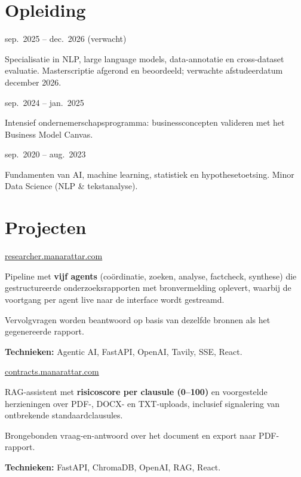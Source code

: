 \documentclass[10pt]{article}
\newcommand{\entry}[2]{\vspace{2pt}{\bfseries #1}\hfill{\small\color{gray}#2}\par}
\newcommand{\project}[2]{\vspace{3pt}{\bfseries #1}\hfill{\footnotesize\color{gray}#2}\par\vspace{-1pt}}
\newcommand{\pskills}[1]{{\small\textbf{Technieken:} #1}\par}
\begin{document}
\section*{Opleiding}
\entry{MA Language \& AI \,\textbar\, Vrije Universiteit Amsterdam}{sep.\ 2025 -- dec.\ 2026 (verwacht)}
\begin{tights}
  \item Specialisatie in NLP, large language models, data-annotatie en cross-dataset evaluatie. Masterscriptie afgerond en beoordeeld; verwachte afstudeerdatum december 2026.
\end{tights}
\entry{Amsterdam Startup Launch Program \,\textbar\, Vrije Universiteit Amsterdam}{sep.\ 2024 -- jan.\ 2025}
\begin{tights}
  \item Intensief ondernemerschapsprogramma: businessconcepten valideren met het Business Model Canvas.
\end{tights}
\entry{BSc Artificial Intelligence \,\textbar\, Vrije Universiteit Amsterdam}{sep.\ 2020 -- aug.\ 2023}
\begin{tights}
  \item Fundamenten van AI, machine learning, statistiek en hypothesetoetsing. Minor Data Science (NLP \& tekstanalyse).
\end{tights}

\newpage

\section*{Projecten}

\project{Multi-Agent Research Assistant}{\href{https://researcher.manarattar.com}{researcher.manarattar.com}}
\begin{tights}
  \item Pipeline met \textbf{vijf agents} (coördinatie, zoeken, analyse, factcheck, synthese) die gestructureerde onderzoeksrapporten met bronvermelding oplevert, waarbij de voortgang per agent live naar de interface wordt gestreamd.
  \item Vervolgvragen worden beantwoord op basis van dezelfde bronnen als het gegenereerde rapport.
\end{tights}
\pskills{Agentic AI, FastAPI, OpenAI, Tavily, SSE, React.}

\project{AI Contract Risk Analyzer}{\href{https://contracts.manarattar.com}{contracts.manarattar.com}}
\begin{tights}
  \item RAG-assistent met \textbf{risicoscore per clausule (0--100)} en voorgestelde herzieningen over PDF-, DOCX- en TXT-uploads, inclusief signalering van ontbrekende standaardclausules.
  \item Brongebonden vraag-en-antwoord over het document en export naar PDF-rapport.
\end{tights}
\pskills{FastAPI, ChromaDB, OpenAI, RAG, React.}
\end{document}
